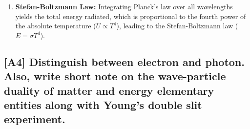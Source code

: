 \documentclass[12pt]{article}
\begin{document}
\begin{itemize}
\begin{enumerate}[label=\alph*.]
\begin{enumerate}[label=\roman*.]
            \item \textbf{Stefan-Boltzmann Law:} Integrating Planck's law over all wavelengths yields the total energy radiated, which is proportional to the fourth power of the absolute temperature ($U\propto T^4$), leading to the Stefan-Boltzmann law ($E=\sigma T^4$).
        \end{enumerate}
    \end{enumerate}
\end{itemize}

\subsection{[A4] Distinguish between electron and photon. Also, write short note on the wave-particle duality of matter and energy elementary entities along with Young's double slit experiment.}
\end{document}
